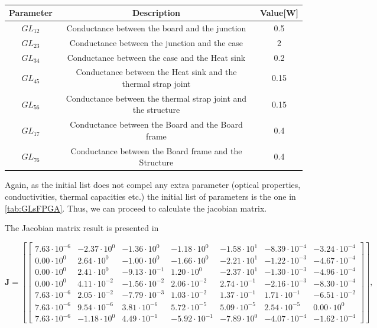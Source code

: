\begin{table}[H]
\centering
\caption{}
\label{tab:GLsFPGA}

\begin{tabular}{c c c}
\toprule
\multicolumn{1}{c}{\textbf{Parameter}} & \multicolumn{1}{c}{\textbf{Description}} & \multicolumn{1}{c}{\textbf{Value}[W]} \\ \midrule
$GL_{12}$  & Conductance between the board and the junction  & 0.5 \\ 
$GL_{23}$  & Conductance between the junction and the case  &  2\\ 
$GL_{34}$  & Conductance between the case and the Heat sink  & 0.2 \\ 
$GL_{45}$  & Conductance between the Heat sink and the thermal strap joint  & 0.15 \\ 
$GL_{56}$  & Conductance between the thermal strap joint and the structure  & 0.15 \\ 
$GL_{17}$  & Conductance between the Board and the Board frame  & 0.4 \\ 
$GL_{76}$  & Conductance between the Board frame and the Structure  & 0.4 \\ \bottomrule
\end{tabular}
\end{table}

Again, as the initial list does not compel any extra parameter (optical properties, conductivities, thermal capacities etc.) the initial list of parameters is the one in \autoref{tab:GLsFPGA}. Thus, we can proceed to calculate the jacobian matrix.

The Jacobian matrix result is presented in 

\begin{equation}
\boldsymbol{J} =\left[\begin{bmatrix}
    7.63 \cdot 10^{-6} & -2.37 \cdot 10^{0} & -1.36 \cdot 10^{0} & -1.18 \cdot 10^{0} & -1.58 \cdot 10^{1} & -8.39 \cdot 10^{-4} & -3.24 \cdot 10^{-4} \\
    0.00 \cdot 10^{0} & 2.64 \cdot 10^{0} & -1.00 \cdot 10^{0} & -1.66 \cdot 10^{0} & -2.21 \cdot 10^{1} & -1.22 \cdot 10^{-3} & -4.67 \cdot 10^{-4} \\
    0.00 \cdot 10^{0} & 2.41 \cdot 10^{0} & -9.13 \cdot 10^{-1} & 1.20 \cdot 10^{0} & -2.37 \cdot 10^{1} & -1.30 \cdot 10^{-3} & -4.96 \cdot 10^{-4} \\
    0.00 \cdot 10^{0} & 4.11 \cdot 10^{-2} & -1.56 \cdot 10^{-2} & 2.06 \cdot 10^{-2} & 2.74 \cdot 10^{-1} & -2.16 \cdot 10^{-3} & -8.30 \cdot 10^{-4} \\
    7.63 \cdot 10^{-6} & 2.05 \cdot 10^{-2} & -7.79 \cdot 10^{-3} & 1.03 \cdot 10^{-2} & 1.37 \cdot 10^{-1} & 1.71 \cdot 10^{-1} & -6.51 \cdot 10^{-2} \\
    7.63 \cdot 10^{-6} & 9.54 \cdot 10^{-6} & 3.81 \cdot 10^{-6} & 5.72 \cdot 10^{-5} & 5.09 \cdot 10^{-5} & 2.54 \cdot 10^{-5} & 0.00 \cdot 10^{0} \\
    7.63 \cdot 10^{-6} & -1.18 \cdot 10^{0} & 4.49 \cdot 10^{-1} & -5.92 \cdot 10^{-1} & -7.89 \cdot 10^{0} & -4.07 \cdot 10^{-4} & -1.62 \cdot 10^{-4}
  \end{bmatrix}\right],
\label{eq:jacobianFPGA}
\end{equation}


